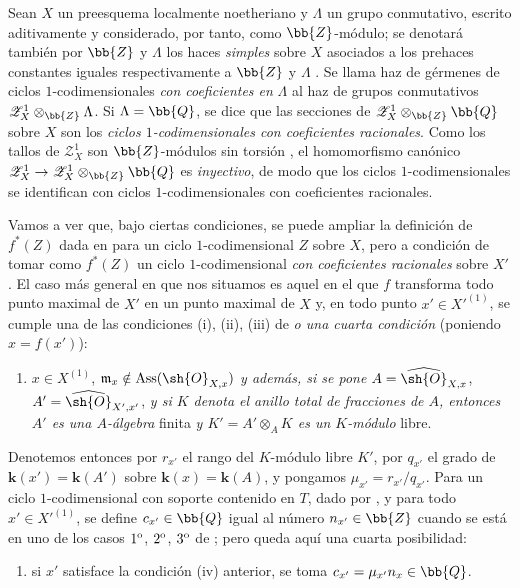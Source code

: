 \begin{env}[21.10.9]
\label{IV.21.10.9}
Sean $X$ un preesquema localmente noetheriano y $\Lambda$ un grupo conmutativo, escrito aditivamente y considerado, por tanto, como $\bb{Z}$-módulo;
se denotará también por $\bb{Z}$ y $\Lambda$ los haces \emph{simples} sobre $X$ asociados a los prehaces constantes iguales respectivamente a $\bb{Z}$ y $\Lambda$ .
Se llama haz de gérmenes de ciclos $1$-codimensionales \emph{con coeficientes en} $\Lambda$ al haz de grupos conmutativos $\mathscr{Z}^1_X\otimes_{\bb{Z}}\Lambda$.
Si $\Lambda=\bb{Q}$, se dice que las secciones
de $\mathscr{Z}^1_X\otimes_{\bb{Z}}\bb{Q}$ sobre $X$ son los \emph{ciclos $1$-codimensionales con coeficientes racionales}.
Como los tallos de $\mathscr{Z}^1_X$ son $\bb{Z}$-módulos sin torsión , el homomorfismo canónico $\mathscr{Z}^1_X\to\mathscr{Z}^1_X\otimes_{\bb{Z}}\bb{Q}$ es \emph{inyectivo}, de modo que los ciclos $1$-codimensionales se identifican con ciclos $1$-codimensionales con coeficientes racionales.
\end{env}

\begin{env}[21.10.10]
\label{IV.21.10.10}
Vamos a ver que, bajo ciertas condiciones, se puede ampliar la definición de $f^*(Z)$ dada en  para un ciclo $1$-codimensional $Z$ sobre $X$, pero a condición de tomar como $f^*(Z)$ un ciclo $1$-codimensional \emph{con coeficientes racionales} sobre $X'$.
El caso más general en que nos situamos es aquel en el que $f$ transforma todo punto maximal de $X'$ en un punto maximal de $X$ y, en todo punto $x'\in X'^{(1)}$, se cumple una de las condiciones (i), (ii), (iii) de  \emph{o una cuarta condición} (poniendo $x=f(x')$):
\begin{enumerate}
  \item[(iv)] $x\in X^{(1)}$, $\mathfrak{m}_x\notin\operatorname{Ass}(\sh{O}_{X,x})$ \emph{y además, si se pone} $A=\widehat{\sh{O}}_{X,x}$, $A'=\widehat{\sh{O}}_{X',x'}$, \emph{y si $K$ denota el anillo total de fracciones de $A$, entonces $A'$ es una $A$-álgebra} finita \emph{y $K'=A'\otimes_AK$ es un $K$-módulo} libre.
\end{enumerate}

Denotemos entonces por $r_{x'}$ el rango del $K$-módulo libre $K'$, por $q_{x'}$ el grado de $\boldsymbol{k}(x')=\boldsymbol{k}(A')$ sobre $\boldsymbol{k}(x)=\boldsymbol{k}(A)$, y pongamos $\mu_{x'}=r_{x'}/q_{x'}$.
Para un ciclo $1$-codimensional con soporte contenido en $T$, dado por , y para todo $x'\in X'^{(1)}$, se define $c_{x'}\in\bb{Q}$ igual al número $n_{x'}\in\bb{Z}$ cuando se está en uno de los casos $1\textsuperscript{o}$, $2\textsuperscript{o}$, $3\textsuperscript{o}$ de ; pero queda aquí una cuarta posibilidad:
\begin{enumerate}
  \item[$4\textsuperscript{o}$] si $x'$ satisface la condición (iv) anterior, se toma $c_{x'}=\mu_{x'}n_x\in\bb{Q}$.
\end{enumerate}
\end{env}

